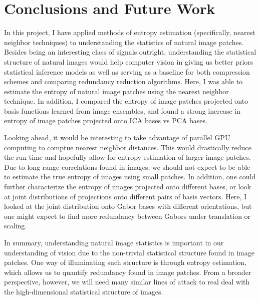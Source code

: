 \documentclass[10pt,twocolumn,letterpaper]{article}
\begin{document}
\section{Conclusions and Future Work}
In this project, I have applied methods of entropy estimation (specifically, nearest neighbor techniques) to understanding the statistics of natural image patches. Besides being an interesting class of signals outright, understanding the statistical structure of natural images would help computer vision in giving us better priors statistical inference models as well as serving as a baseline for both compression schemes and comparing redundancy reduction algorithms. Here, I was able to estimate the entropy of natural image patches using the nearest neighbor technique. In addition, I compared the entropy of image patches projected onto basis functions learned from image ensembles, and found a strong increase in entropy of image patches projected onto ICA bases vs PCA bases.

Looking ahead, it would be interesting to take advantage of parallel GPU computing to comptue nearest neighbor distances. This would drastically reduce the run time and hopefully allow for entropy estimation of larger image patches. Due to long range correlations found in images, we should not expect to be able to estimate the true entropy of images using small patches. In addition, one could further characterize the entropy of images projected onto different bases, or look at joint distributions of projections onto different pairs of basis vectors. Here, I looked at the joint distribution onto Gabor bases with different orientations, but one might expect to find more redundancy between Gabors under translation or scaling.

In summary, understanding natural image statistics is important in our understanding of vision due to the non-trivial statistical structure found in image patches. One way of illuminating such structure is through entropy estimation, which allows us to quantify redundancy found in image patches. From a broader perspective, however, we will need many similar lines of attack to real deal with the high-dimensional statistical structure of images.



\end{document}
